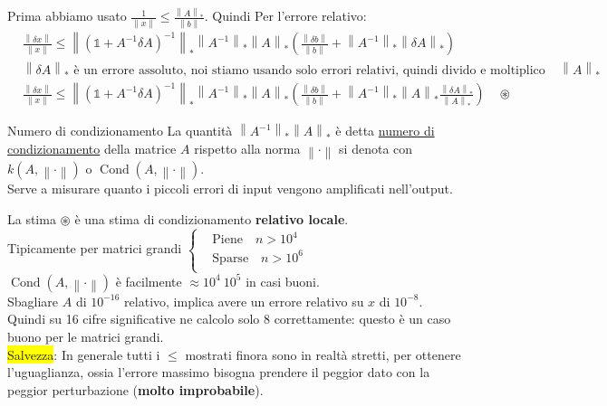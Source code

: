 \documentclass{article}
\begin{document}
\begin{itemize}
          Prima abbiamo usato $\frac{1}{\left\|x\right\|}\le\frac{\left\|A\right\|_*}{\left\|b\right\|}$. Quindi Per l'errore relativo:
          \begin{align*}
               & \frac{\left\|\delta x\right\|}{\left\|x\right\|}\le\left\|\left(\mathbb 1+A^{-1}\delta A\right)^{-1}\right\|_*\left\|A^{-1}\right\|_*\left\|A\right\|_*\left(\frac{\left\|\delta b\right\|}{\left\|b\right\|}+\left\|A^{-1}\right\|_*\left\|\delta A\right\|_*\right)                                                                              \\
               & \text{$\left\|\delta A\right\|_*$ è un errore assoluto, noi stiamo usando solo errori relativi, quindi divido e moltiplico per $\left\|A\right\|_*$}                                                                                                                                                                                               \\
               & \frac{\left\|\delta x\right\|}{\left\|x\right\|}\le\left\|\left(\mathbb 1+A^{-1}\delta A\right)^{-1}\right\|_*\boxed{\left\|A^{-1}\right\|_*\left\|A\right\|_*}\left(\frac{\left\|\delta b\right\|}{\left\|b\right\|}+\boxed{\left\|A^{-1}\right\|_*\left\|A\right\|_*}\frac{\left\|\delta A\right\|_*}{\left\|A\right\|_*}\right)\quad\circledast
          \end{align*}
\end{itemize}
\begin{defi}{Numero di condizionamento}{}
    La quantità $\left\|A^{-1}\right\|_*\left\|A\right\|_*$ è detta \underline{numero di condizionamento} della matrice $A$ rispetto alla norma $\left\|\cdot\right\|$
    si denota con $k(A,\left\|\cdot\right\|)$ o $\operatorname{Cond}(A,\left\|\cdot\right\|)$.\\

    Serve a misurare quanto i piccoli errori di input vengono amplificati nell'output.
\end{defi}

La stima $\circledast$ è una stima di condizionamento \textbf{relativo locale}.\\

Tipicamente per matrici grandi $\begin{cases}
         & \text{Piene}\quad n>10^4  \\
         & \text{Sparse}\quad n>10^6 \\
    \end{cases}$\\
$\operatorname{Cond}(A,\left\|\cdot\right\|)$ è facilmente $\approx 10^4\ 10^5$ in casi buoni.\\
Sbagliare $A$ di $10^{-16}$ relativo, implica avere un errore relativo su $x$ di $10^{-8}$. Quindi su 16 cifre significative
ne calcolo solo 8 correttamente: questo è un caso buono per le matrici grandi.\\
\colorbox{yellow}{Salvezza}: In generale tutti i $\le$ mostrati finora sono in realtà stretti, per ottenere l'uguaglianza, ossia l'errore massimo
bisogna prendere il peggior dato con la peggior perturbazione (\textbf{molto improbabile}).
\end{document}
